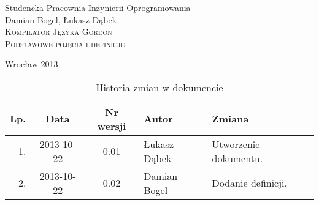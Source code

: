 \documentclass[12pt,leqno, twoside]{mwart}
\begin{document}
\begin{titlepage}
\begin{center}
Studencka Pracownia Inżynierii Oprogramowania\\[6cm]

Damian Bogel, Łukasz Dąbek\\[1cm]
\textsc{\LARGE Kompilator Języka Gordon}\\[0.5cm]
\textsc{\large Podstawowe pojęcia i definicje}

\vfill
Wrocław 2013 \\[2.5cm]

\end{center}
\end{titlepage}

\newpage
\begin{table}
	\centering
	\caption{Historia zmian w dokumencie}
		\begin{tabular}{|r|c|c|l|l|}
		\hline
		Lp.  & Data       & Nr wersji & Autor                 & Zmiana \\ \hline
		1.   & 2013-10-22 & 0.01 & Łukasz Dąbek & Utworzenie dokumentu. \\ \hline
        2.   & 2013-10-22 & 0.02 & Damian Bogel & Dodanie definicji. \\ \hline
	\end{tabular}
\end{table}
\newpage

\tableofcontents
\setcounter{page}{2}

\newpage
\end{document}

